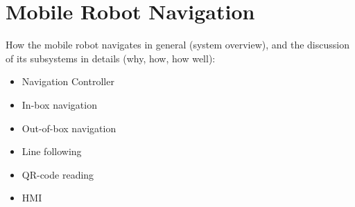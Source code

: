 \section{Mobile Robot Navigation \label{sec:navigation_sec}}

How the mobile robot navigates in general (system overview), and the discussion of its subsystems in details (why, how, how well):
\begin{itemize}
    \item Navigation Controller
    \item In-box navigation
    \item Out-of-box navigation
    \item Line following
    \item QR-code reading
    \item HMI
\end{itemize}
